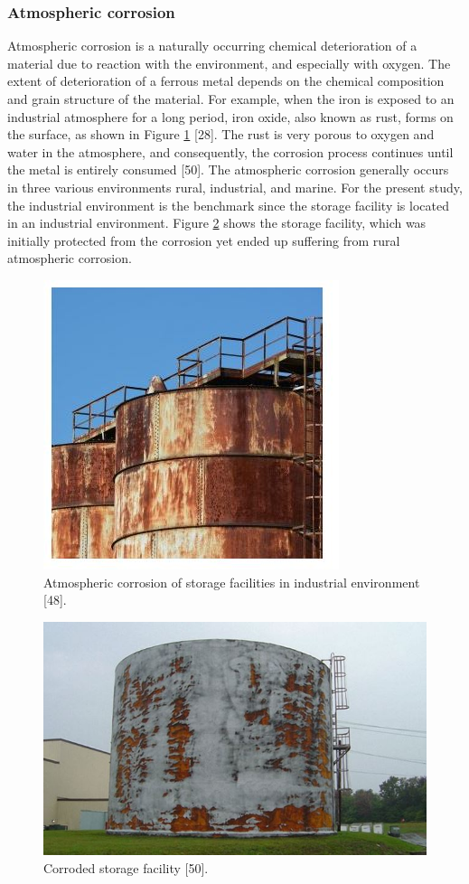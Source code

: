 \documentclass[12pt]{report}
\begin{document}
\subsubsection{Atmospheric corrosion}
Atmospheric corrosion is a naturally occurring chemical deterioration of a material due to reaction with the environment, and especially with oxygen. The extent of deterioration of a ferrous metal depends on the chemical composition and grain structure of the material. For example, when the iron is exposed to an industrial atmosphere for a long period, iron oxide, also known as rust, forms on the surface, as shown in Figure \ref{ch3:figure:corrosion} [28]. The rust is very porous to oxygen and water in the atmosphere, and consequently, the corrosion process continues until the metal is entirely consumed [50].  The atmospheric corrosion generally occurs in three various environments rural, industrial, and marine. For the present study, the industrial environment is the benchmark since the storage facility is located in an industrial environment. Figure \ref{ch3:figure:corroded} shows the storage facility, which was initially protected from the corrosion yet ended up suffering from rural atmospheric corrosion.

\begin{figure}[H]
    \centering
    \includegraphics[width=.4\textwidth]{corrosion_of_storage_facilities.jpg}
    \caption{Atmospheric corrosion of storage facilities in industrial environment [48].}
    \label{ch3:figure:corrosion}
\end{figure}
 
\begin{figure}[H]
    \centering
    \includegraphics[width=\textwidth]{corroded_storage.jpg}
    \caption{Corroded storage facility [50].}
    \label{ch3:figure:corroded}
\end{figure}
\end{document}
